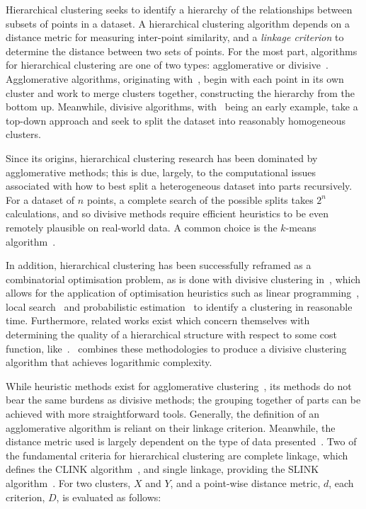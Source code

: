 Hierarchical clustering seeks to identify a hierarchy of the relationships
between subsets of points in a dataset. A hierarchical clustering algorithm
depends on a distance metric for measuring inter-point similarity, and a
\emph{linkage criterion} to determine the distance between two sets of points.
For the most part, algorithms for hierarchical clustering are one of two types:
agglomerative or divisive~\cite{Kaufman1990}. Agglomerative algorithms,
originating with~\cite{Johnson1967,Ward1963}, begin with each point in its own
cluster and work to merge clusters together, constructing the hierarchy from the
bottom up. Meanwhile, divisive algorithms, with~\cite{Edwards1965} being an
early example, take a top-down approach and seek to split the dataset into
reasonably homogeneous clusters.

Since its origins, hierarchical clustering research has been dominated by
agglomerative methods; this is due, largely, to the computational issues
associated with how to best split a heterogeneous dataset into parts
recursively. For a dataset of \(n\) points, a complete search of the possible
splits takes \(2^n\) calculations, and so divisive methods require efficient
heuristics to be even remotely plausible on real-world data. A common choice is
the \(k\)-means algorithm~\cite{Moseley2017,Peterson2018}.

In addition, hierarchical clustering has been successfully reframed as a
combinatorial optimisation problem, as is done with divisive clustering
in~\cite{Dasgupta2016}, which allows for the application of optimisation
heuristics such as linear programming~\cite{Roy2017}, local
search~\cite{Aljarah2019} and probabilistic estimation~\cite{Fan2015} to
identify a clustering in reasonable time. Furthermore, related works exist which
concern themselves with determining the quality of a hierarchical structure with
respect to some cost function,
like~\cite{Bilu2012,Lyzinski2017}.~\cite{CohenAddad2018} combines these
methodologies to produce a divisive clustering algorithm that achieves
logarithmic complexity.

While heuristic methods exist for agglomerative
clustering~\cite{Aljarah2019,Fan2015}, its methods do not bear the same burdens
as divisive methods; the grouping together of parts can be achieved with more
straightforward tools. Generally, the definition of an agglomerative
algorithm is reliant on their linkage criterion. Meanwhile, the
distance metric used is largely dependent on the type of data
presented~\cite{Nielsen2016}. Two of the fundamental criteria for hierarchical
clustering are complete linkage, which defines the CLINK
algorithm~\cite{Defays1977}, and single linkage, providing the SLINK
algorithm~\cite{Sibson1973}. For two clusters, \(X\) and \(Y\), and a point-wise
distance metric, \(d\), each criterion, \(D\), is evaluated as follows:


